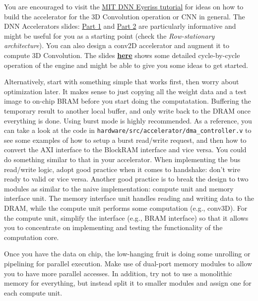 \documentclass[11pt]{article}
\begin{document}
You are encouraged to visit the \href{http://eyeriss.mit.edu/tutorial.html}{MIT DNN Eyeriss tutorial} for ideas on how to build the accelerator for the 3D Convolution operation or CNN in general. The DNN Accelerators slides: \href{http://www.rle.mit.edu/eems/wp-content/uploads/2019/06/Tutorial-on-DNN-05-DNN-Accelerator-Architectures.pdf}{Part 1} and \href{http://www.rle.mit.edu/eems/wp-content/uploads/2019/06/Tutorial-on-DNN-06-RS-Dataflow-and-NoC.pdf}{Part 2} are particularly informative and might be useful for you as a starting point (check the \textit{Row-stationary architecture}). You can also design a conv2D accelerator and augment it to compute 3D Convolution. The slides \href{https://drive.google.com/file/d/1SJ6eUK9qJZXzZpeHY_D31d1M95nZMTjR/view?usp=sharing}{\textbf{here}} shows some detailed cycle-by-cycle operation of the engine and might be able to give you some ideas to get started.

Alternatively, start with something simple that works first, then worry about optimization later. It makes sense to just copying all the weight data and a test image to on-chip BRAM before you start doing the computatation. Buffering the temporary result to another local buffer, and only write back to the DRAM once everything is done. Using burst mode is highly recommended. As a reference, you can take a look at the code in \verb|hardware/src/accelerator/dma_controller.v| to see some examples of how to setup a burst read/write request, and then how to convert the AXI interface to the BlockRAM interface and vice versa. You could do something similar to that in your accelerator. When implementing the bus read/write logic, adopt good practice when it comes to handshake: don't wire ready to valid or vice versa. Another good practice is to break the design to two modules as similar to the naive implementation: compute unit and memory interface unit. The memory interface unit handles reading and writing data to the DRAM, while the compute unit performs some computation (e.g., conv3D). For the compute unit, simplify the interface (e.g., BRAM interface) so that it allows you to concentrate on implementing and testing the functionality of the computation core.

Once you have the data on chip, the low-hanging fruit is doing some unrolling or pipelining for parallel execution. Make use of dual-port memory modules to allow you to have more parallel accesses. In addition, try not to use a monolithic memory for everything, but instead split it to smaller modules and assign one for each compute unit.
\end{document}
